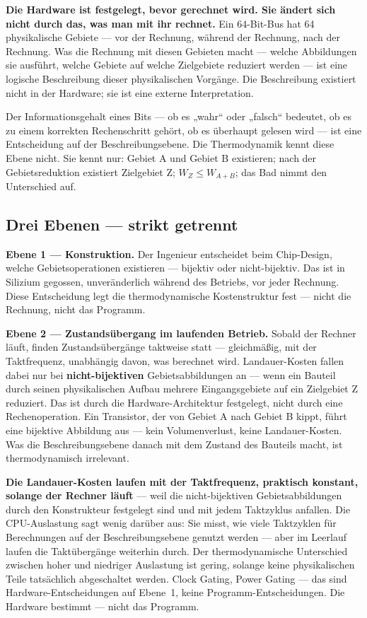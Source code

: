 \textbf{Die Hardware ist festgelegt, bevor gerechnet wird. Sie ändert sich nicht
durch das, was man mit ihr rechnet.} Ein 64-Bit-Bus hat 64 physikalische Gebiete
--- vor der Rechnung, während der Rechnung, nach der Rechnung. Was die Rechnung
mit diesen Gebieten macht --- welche Abbildungen sie ausführt, welche Gebiete auf
welche Zielgebiete reduziert werden --- ist eine logische Beschreibung dieser
physikalischen Vorgänge. Die Beschreibung existiert nicht in der Hardware; sie ist
eine externe Interpretation.

Der Informationsgehalt eines Bits --- ob es „wahr“ oder „falsch“ bedeutet, ob es
zu einem korrekten Rechenschritt gehört, ob es überhaupt gelesen wird --- ist eine
Entscheidung auf der Beschreibungsebene. Die Thermodynamik kennt diese Ebene
nicht. Sie kennt nur: Gebiet A und Gebiet B existieren; nach der Gebietsreduktion
existiert Zielgebiet Z; $W_Z \le W_{A+B}$; das Bad nimmt den Unterschied auf.

\subsection{Drei Ebenen --- strikt getrennt}

\LB \textbf{Ebene 1 --- Konstruktion.} Der Ingenieur entscheidet beim Chip-Design,
welche Gebietsoperationen existieren --- bijektiv oder nicht-bijektiv. Das ist in
Silizium gegossen, unveränderlich während des Betriebs, vor jeder Rechnung. Diese
Entscheidung legt die thermodynamische Kostenstruktur fest --- nicht die Rechnung,
nicht das Programm.

\LB \textbf{Ebene 2 --- Zustandsübergang im laufenden Betrieb.} Sobald der Rechner
läuft, finden Zustandsübergänge taktweise statt --- gleichmäßig, mit der
Taktfrequenz, unabhängig davon, was berechnet wird. Landauer-Kosten fallen dabei
nur bei \textbf{nicht-bijektiven} Gebietsabbildungen an --- wenn ein Bauteil durch
seinen physikalischen Aufbau mehrere Eingangsgebiete auf ein Zielgebiet Z
reduziert. Das ist durch die Hardware-Architektur festgelegt, nicht durch eine
Rechenoperation. Ein Transistor, der von Gebiet A nach Gebiet B kippt, führt eine
bijektive Abbildung aus --- kein Volumenverlust, keine Landauer-Kosten. Was die
Beschreibungsebene danach mit dem Zustand des Bauteils macht, ist thermodynamisch
irrelevant.

\textbf{Die Landauer-Kosten laufen mit der Taktfrequenz, praktisch konstant,
solange der Rechner läuft} --- weil die nicht-bijektiven Gebietsabbildungen durch
den Konstrukteur festgelegt sind und mit jedem Taktzyklus anfallen. Die
CPU-Auslastung sagt wenig darüber aus: Sie misst, wie viele Taktzyklen für
Berechnungen auf der Beschreibungsebene genutzt werden --- aber im Leerlauf laufen
die Taktübergänge weiterhin durch. Der thermodynamische Unterschied zwischen hoher
und niedriger Auslastung ist gering, solange keine physikalischen Teile
tatsächlich abgeschaltet werden. Clock Gating, Power Gating --- das sind
Hardware-Entscheidungen auf Ebene~1, keine Programm-Entscheidungen. Die Hardware
bestimmt --- nicht das Programm.


